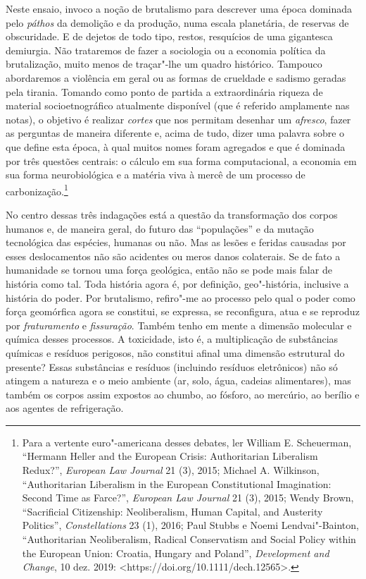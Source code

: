 \begin{multicols}{2}
Neste ensaio, invoco a noção de brutalismo para descrever uma época
dominada pelo \textit{páthos} da demolição e da produção, numa escala
planetária, de reservas de obscuridade. E de dejetos de todo tipo,
restos, resquícios de uma gigantesca demiurgia. Não trataremos de fazer
a sociologia ou a economia política da brutalização, muito menos de
traçar"-lhe um quadro histórico. Tampouco abordaremos a violência em
geral ou as formas de crueldade e sadismo geradas pela tirania. Tomando
como ponto de partida a extraordinária riqueza de material
socioetnográfico atualmente disponível (que é referido amplamente nas
notas), o objetivo é realizar \textit{cortes} que nos permitam desenhar um
\textit{afresco}, fazer as perguntas de maneira diferente e, acima de
tudo, dizer uma palavra sobre o que define esta época, à qual muitos
nomes foram agregados e que é dominada por três questões centrais: o
cálculo em sua forma computacional, a economia em sua forma
neurobiológica e a matéria viva à mercê de um processo de
carbonização.\footnote{Para a vertente euro"-americana desses debates,
  ler William E. Scheuerman, ``Hermann Heller and the European Crisis:
  Authoritarian Liberalism Redux?'', \textit{European Law Journal} 21 (3),
  2015; Michael A. Wilkinson, ``Authoritarian Liberalism in the European
  Constitutional Imagination: Second Time as Farce?'', \textit{European
  Law Journal} 21 (3), 2015; Wendy Brown, ``Sacrificial Citizenship:
  Neoliberalism, Human Capital, and Austerity Politics'',
  \textit{Constellations} 23 (1), 2016; Paul Stubbs e Noemi
  Lendvai"-Bainton, ``Authoritarian Neoliberalism, Radical Conservatism
  and Social Policy within the European Union: Croatia, Hungary and
  Poland'', \textit{Development and Change}, 10 dez. 2019:
  \textless{}https://doi.org/10.1111/dech.12565\textgreater{}.}

  No centro dessas três indagações está a questão da transformação dos
corpos humanos e, de maneira geral, do futuro das ``populações'' e da
mutação tecnológica das espécies, humanas ou não. Mas as lesões e
feridas causadas por esses deslocamentos não são acidentes ou meros
danos colaterais. Se de fato a humanidade se tornou uma força geológica,
então não se pode mais falar de história como tal. Toda história agora
é, por definição, geo"-história, inclusive a história do poder. Por
brutalismo, refiro"-me ao processo pelo qual o poder como força
geomórfica agora se constitui, se expressa, se reconfigura, atua e se
reproduz por \textit{fraturamento} e \textit{fissuração}. Também tenho em
mente a dimensão molecular e química desses processos. A toxicidade,
isto é, a multiplicação de substâncias químicas e resíduos perigosos,
não constitui afinal uma dimensão estrutural do presente? Essas
substâncias e resíduos (incluindo resíduos eletrônicos) não só atingem a
natureza e o meio ambiente (ar, solo, água, cadeias alimentares), mas
também os corpos assim expostos ao chumbo, ao fósforo, ao mercúrio, ao
berílio e aos agentes de refrigeração.


\end{multicols}
